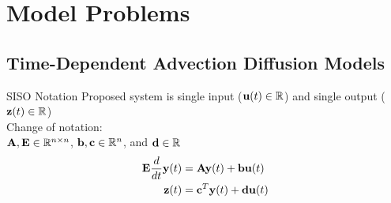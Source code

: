 \section{Model Problems}

\subsection{Time-Dependent Advection Diffusion Models}

\begin{frame}{SISO Notation}
Proposed system is single input (${\bf u}(t) \in \mathbb{R}$) and single output (${\bf z}(t) \in \mathbb{R}$)\\
\bigskip
Change of notation:\\
\bigskip
${\mathbf A}, {\bf E} \in \mathbb{R}^{n \times n}$, ${\bf b},{\bf c} \in \mathbb{R}^n$, and ${\bf d} \in \mathbb{R}$\\

\begin{align*}
            {\bf E}\frac{d}{dt} {\bf y}(t)  &= {\mathbf A} {\bf y}(t) + {\bf b}{\bf u}(t)\\
            {\bf z}(t) &= {\bf c}^T {\bf y}(t) + {\bf d}{\bf u}(t)
\end{align*}


\end{frame}

